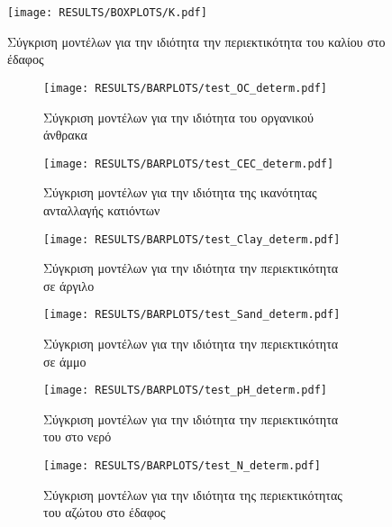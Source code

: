 \begin{figure}[H]
    \begin{center}
        \texttt{[image: RESULTS/BOXPLOTS/K.pdf]}
        \caption{Σύγκριση μοντέλων για την ιδιότητα την περιεκτικότητα του καλίου στο έδαφος}
        \label{fig:K_boxplot}
    \end{center}
\end{figure}

\begin{figure}[H]
    \begin{subfigure}{0.5\textwidth}
        \texttt{[image: RESULTS/BARPLOTS/test\_OC\_determ.pdf]}
        \caption{Σύγκριση μοντέλων για την ιδιότητα του οργανικού άνθρακα}
        \label{fig:OC_determ}
    \end{subfigure}
    \begin{subfigure}{0.5\textwidth}
        \texttt{[image: RESULTS/BARPLOTS/test\_CEC\_determ.pdf]}
        \caption{Σύγκριση μοντέλων για την ιδιότητα της ικανότητας ανταλλαγής κατιόντων}
        \label{fig:CEC_determ}
    \end{subfigure}
    \caption{}
\end{figure}
\begin{figure}[H]
    \begin{subfigure}{0.5\textwidth}
        \texttt{[image: RESULTS/BARPLOTS/test\_Clay\_determ.pdf]}
        \caption{Σύγκριση μοντέλων για την ιδιότητα την περιεκτικότητα σε άργιλο}
        \label{fig:Clay_determ}
    \end{subfigure}
    \begin{subfigure}{0.5\textwidth}
        \texttt{[image: RESULTS/BARPLOTS/test\_Sand\_determ.pdf]}
        \caption{Σύγκριση μοντέλων για την ιδιότητα την περιεκτικότητα σε άμμο}
        \label{fig:Sand_determ}
    \end{subfigure}
    \caption{}
\end{figure}
\begin{figure}[H]
    \begin{subfigure}{0.5\textwidth}
        \texttt{[image: RESULTS/BARPLOTS/test\_pH\_determ.pdf]}
        \caption{Σύγκριση μοντέλων για την ιδιότητα την περιεκτικότητα του  στο νερό}
        \label{fig:pH_determ}
    \end{subfigure}
    \begin{subfigure}{0.5\textwidth}
        \texttt{[image: RESULTS/BARPLOTS/test\_N\_determ.pdf]}
        \caption{Σύγκριση μοντέλων για την ιδιότητα της περιεκτικότητας του αζώτου στο έδαφος}
        \label{fig:N_determ}
    \end{subfigure}
    \caption{}
\end{figure}
